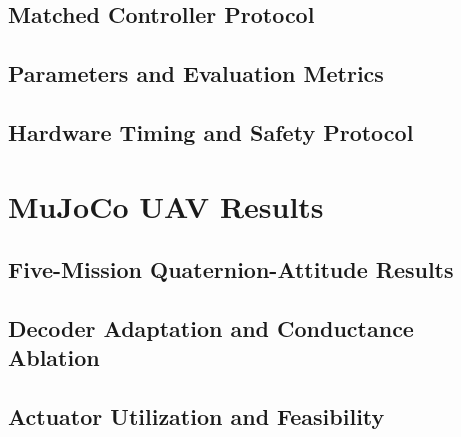 \documentclass[letterpaper,10pt,conference]{ieeeconf}
\begin{document}
\subsection{Matched Controller Protocol}


\subsection{Parameters and Evaluation Metrics}


\subsection{Hardware Timing and Safety Protocol}


\section{MuJoCo UAV Results}
\label{sec:mujoco_results}

\subsection{Five-Mission Quaternion-Attitude Results}


\subsection{Decoder Adaptation and Conductance Ablation}


\subsection{Actuator Utilization and Feasibility}
\end{document}
